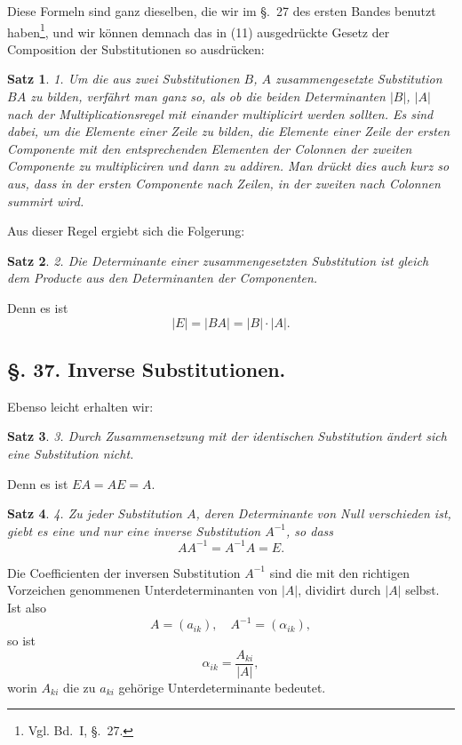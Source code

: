 \documentclass[12pt,a4paper]{article}
\theoremstyle{plain}
\newtheorem{satz}{Satz}[section]
\theoremstyle{definition}
\theoremstyle{remark}
\begin{document}
Diese Formeln sind ganz dieselben, die wir im \S.~27 des ersten Bandes benutzt haben\footnote{Vgl. Bd.~I, \S.~27.}, und wir können demnach das in (11) ausgedrückte Gesetz der Composition der Substitutionen so ausdrücken:

\begin{satz}
1. Um die aus zwei Substitutionen $B$, $A$ zusammengesetzte Substitution $BA$ zu bilden, verfährt man ganz so, als ob die beiden Determinanten $|B|$, $|A|$ nach der Multiplicationsregel mit einander multiplicirt werden sollten. Es sind dabei, um die Elemente einer Zeile zu bilden, die Elemente einer Zeile der ersten Componente mit den entsprechenden Elementen der Colonnen der zweiten Componente zu multipliciren und dann zu addiren. Man drückt dies auch kurz so aus, dass in der ersten Componente nach Zeilen, in der zweiten nach Colonnen summirt wird.
\end{satz}

Aus dieser Regel ergiebt sich die Folgerung:

\begin{satz}
2. Die Determinante einer zusammengesetzten Substitution ist gleich dem Producte aus den Determinanten der Componenten.
\end{satz}

Denn es ist
\[
|E| = |BA| = |B| \cdot |A|.
\]

\subsection*{\S. 37. Inverse Substitutionen.}

Ebenso leicht erhalten wir:

\begin{satz}
3. Durch Zusammensetzung mit der identischen Substitution ändert sich eine Substitution nicht.
\end{satz}

Denn es ist $EA = AE = A$.

\begin{satz}
4. Zu jeder Substitution $A$, deren Determinante von Null verschieden ist, giebt es eine und nur eine inverse Substitution $A^{-1}$, so dass
\[
AA^{-1} = A^{-1}A = E.
\]
\end{satz}

Die Coefficienten der inversen Substitution $A^{-1}$ sind die mit den richtigen Vorzeichen genommenen Unterdeterminanten von $|A|$, dividirt durch $|A|$ selbst. Ist also
\[
A = (a_{ik}),\quad A^{-1} = (\alpha_{ik}),
\]
so ist
\[
\alpha_{ik} = \frac{A_{ki}}{|A|},
\]
worin $A_{ki}$ die zu $a_{ki}$ gehörige Unterdeterminante bedeutet.
\end{document}
